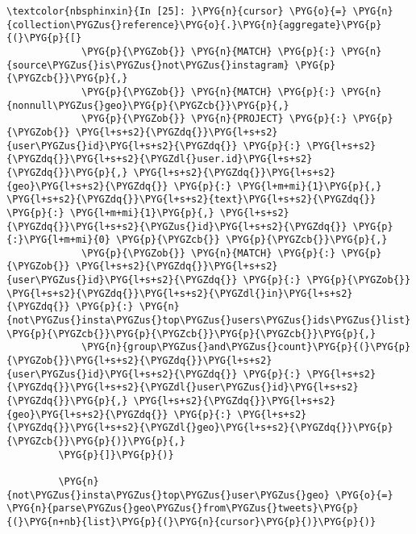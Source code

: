 \documentclass[letterpaper,10pt,english]{sphinxmanual}
\begin{document}
%
\begin{Verbatim}[commandchars=\\\{\}]
\textcolor{nbsphinxin}{In [25]: }\PYG{n}{cursor} \PYG{o}{=} \PYG{n}{collection\PYGZus{}reference}\PYG{o}{.}\PYG{n}{aggregate}\PYG{p}{(}\PYG{p}{[}
             \PYG{p}{\PYGZob{}} \PYG{n}{MATCH} \PYG{p}{:} \PYG{n}{source\PYGZus{}is\PYGZus{}not\PYGZus{}instagram} \PYG{p}{\PYGZcb{}}\PYG{p}{,}
             \PYG{p}{\PYGZob{}} \PYG{n}{MATCH} \PYG{p}{:} \PYG{n}{nonnull\PYGZus{}geo}\PYG{p}{\PYGZcb{}}\PYG{p}{,}
             \PYG{p}{\PYGZob{}} \PYG{n}{PROJECT} \PYG{p}{:} \PYG{p}{\PYGZob{}} \PYG{l+s+s2}{\PYGZdq{}}\PYG{l+s+s2}{user\PYGZus{}id}\PYG{l+s+s2}{\PYGZdq{}} \PYG{p}{:} \PYG{l+s+s2}{\PYGZdq{}}\PYG{l+s+s2}{\PYGZdl{}user.id}\PYG{l+s+s2}{\PYGZdq{}}\PYG{p}{,} \PYG{l+s+s2}{\PYGZdq{}}\PYG{l+s+s2}{geo}\PYG{l+s+s2}{\PYGZdq{}} \PYG{p}{:} \PYG{l+m+mi}{1}\PYG{p}{,} \PYG{l+s+s2}{\PYGZdq{}}\PYG{l+s+s2}{text}\PYG{l+s+s2}{\PYGZdq{}} \PYG{p}{:} \PYG{l+m+mi}{1}\PYG{p}{,} \PYG{l+s+s2}{\PYGZdq{}}\PYG{l+s+s2}{\PYGZus{}id}\PYG{l+s+s2}{\PYGZdq{}} \PYG{p}{:}\PYG{l+m+mi}{0} \PYG{p}{\PYGZcb{}} \PYG{p}{\PYGZcb{}}\PYG{p}{,}
             \PYG{p}{\PYGZob{}} \PYG{n}{MATCH} \PYG{p}{:} \PYG{p}{\PYGZob{}} \PYG{l+s+s2}{\PYGZdq{}}\PYG{l+s+s2}{user\PYGZus{}id}\PYG{l+s+s2}{\PYGZdq{}} \PYG{p}{:} \PYG{p}{\PYGZob{}} \PYG{l+s+s2}{\PYGZdq{}}\PYG{l+s+s2}{\PYGZdl{}in}\PYG{l+s+s2}{\PYGZdq{}} \PYG{p}{:} \PYG{n}{not\PYGZus{}insta\PYGZus{}top\PYGZus{}users\PYGZus{}ids\PYGZus{}list} \PYG{p}{\PYGZcb{}}\PYG{p}{\PYGZcb{}}\PYG{p}{\PYGZcb{}}\PYG{p}{,}
             \PYG{n}{group\PYGZus{}and\PYGZus{}count}\PYG{p}{(}\PYG{p}{\PYGZob{}}\PYG{l+s+s2}{\PYGZdq{}}\PYG{l+s+s2}{user\PYGZus{}id}\PYG{l+s+s2}{\PYGZdq{}} \PYG{p}{:} \PYG{l+s+s2}{\PYGZdq{}}\PYG{l+s+s2}{\PYGZdl{}user\PYGZus{}id}\PYG{l+s+s2}{\PYGZdq{}}\PYG{p}{,} \PYG{l+s+s2}{\PYGZdq{}}\PYG{l+s+s2}{geo}\PYG{l+s+s2}{\PYGZdq{}} \PYG{p}{:} \PYG{l+s+s2}{\PYGZdq{}}\PYG{l+s+s2}{\PYGZdl{}geo}\PYG{l+s+s2}{\PYGZdq{}}\PYG{p}{\PYGZcb{}}\PYG{p}{)}\PYG{p}{,}
         \PYG{p}{]}\PYG{p}{)}
         
         \PYG{n}{not\PYGZus{}insta\PYGZus{}top\PYGZus{}user\PYGZus{}geo} \PYG{o}{=} \PYG{n}{parse\PYGZus{}geo\PYGZus{}from\PYGZus{}tweets}\PYG{p}{(}\PYG{n+nb}{list}\PYG{p}{(}\PYG{n}{cursor}\PYG{p}{)}\PYG{p}{)}
\end{Verbatim}
\end{document}
